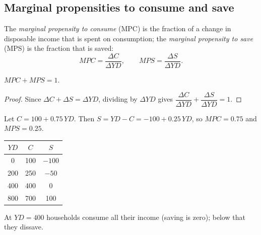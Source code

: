 \subsection{Marginal propensities to consume and save}

\begin{definition}
The \emph{marginal propensity to consume} (MPC) is the fraction of a change in disposable
income that is spent on consumption; the \emph{marginal propensity to save} (MPS) is the
fraction that is saved:
\[
  MPC = \frac{\Delta C}{\Delta YD}, \qquad MPS = \frac{\Delta S}{\Delta YD}.
\]
\end{definition}

\begin{proposition}
$MPC + MPS = 1$.
\end{proposition}
\begin{proof}
Since $\Delta C + \Delta S = \Delta YD$, dividing by $\Delta YD$ gives
$\dfrac{\Delta C}{\Delta YD} + \dfrac{\Delta S}{\Delta YD} = 1$.
\end{proof}

\begin{example}
Let $C = 100 + 0.75\,YD$. Then $S = YD - C = -100 + 0.25\,YD$, so $MPC = 0.75$ and
$MPS = 0.25$.
\begin{center}
\begin{tabular}{ccc}
\toprule
$YD$ & $C$ & $S$ \\
\midrule
0 & 100 & $-100$ \\
200 & 250 & $-50$ \\
400 & 400 & 0 \\
800 & 700 & 100 \\
\bottomrule
\end{tabular}
\end{center}
At $YD = 400$ households consume all their income (saving is zero); below that they
dissave.
\end{example}

